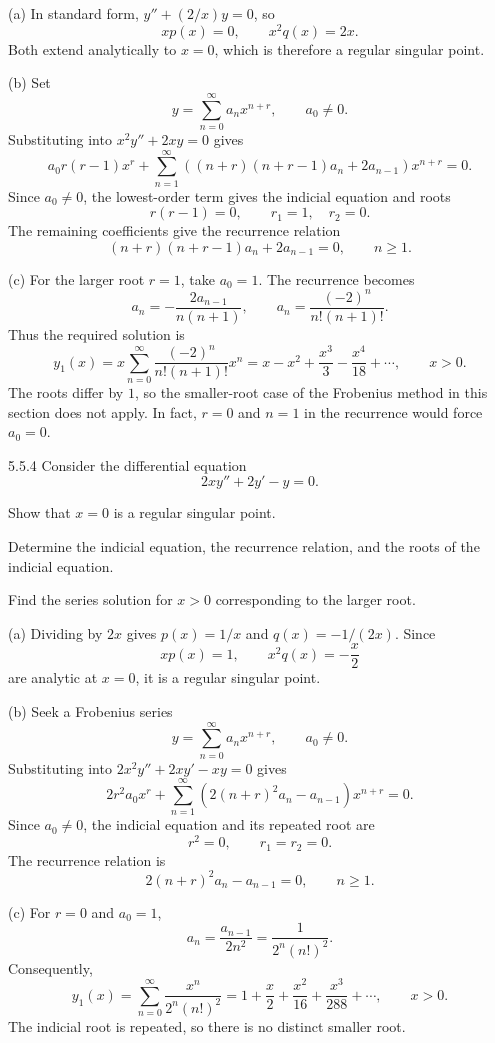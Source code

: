 \documentclass[11pt,oneside]{article}
\begin{document}
\begin{solution}
\noindent\textup{(a)} In standard form, $y''+(2/x)y=0$, so
\[
    xp(x)=0, \qquad x^2q(x)=2x.
\]
Both extend analytically to $x=0$, which is therefore a regular singular point.

\noindent\textup{(b)} Set
\[
    y=\sum_{n=0}^{\infty}a_nx^{n+r}, \qquad a_0\ne0.
\]
Substituting into $x^2y''+2xy=0$ gives
\[
    a_0r(r-1)x^r+\sum_{n=1}^{\infty}((n+r)(n+r-1)a_n+2a_{n-1})x^{n+r}=0.
\]
Since $a_0\ne0$, the lowest-order term gives the indicial equation and roots
\[
    \boxed{r(r-1)=0, \qquad r_1=1, \quad r_2=0}.
\]
The remaining coefficients give the recurrence relation
\[
    \boxed{(n+r)(n+r-1)a_n+2a_{n-1}=0}, \qquad n\geq1.
\]

\noindent\textup{(c)} For the larger root $r=1$, take $a_0=1$. The recurrence becomes
\[
    a_n=-\frac{2a_{n-1}}{n(n+1)}, \qquad
    a_n=\frac{(-2)^n}{n!(n+1)!}.
\]
Thus the required solution is
\[
    \boxed{y_1(x)=x\sum_{n=0}^{\infty}\frac{(-2)^n}{n!(n+1)!}x^n
    =x-x^2+\frac{x^3}{3}-\frac{x^4}{18}+\cdots}, \qquad x>0.
\]
The roots differ by $1$, so the smaller-root case of the Frobenius method in this section does not apply. In fact, $r=0$ and $n=1$ in the recurrence would force $a_0=0$.
\end{solution}

\begin{problem}{5.5.4}
Consider the differential equation
\[
    2xy''+2y'-y=0.
\]
\begin{problemsubparts}
    \item Show that $x=0$ is a regular singular point.
    \item Determine the indicial equation, the recurrence relation, and the roots of the indicial equation.
    \item Find the series solution for $x>0$ corresponding to the larger root.
\end{problemsubparts}
\end{problem}

\begin{solution}
\noindent\textup{(a)} Dividing by $2x$ gives $p(x)=1/x$ and $q(x)=-1/(2x)$. Since
\[
    xp(x)=1, \qquad x^2q(x)=-\frac{x}{2}
\]
are analytic at $x=0$, it is a regular singular point.

\noindent\textup{(b)} Seek a Frobenius series
\[
    y=\sum_{n=0}^{\infty}a_nx^{n+r}, \qquad a_0\ne0.
\]
Substituting into $2x^2y''+2xy'-xy=0$ gives
\[
    2r^2a_0x^r+\sum_{n=1}^{\infty}(2(n+r)^2a_n-a_{n-1})x^{n+r}=0.
\]
Since $a_0\ne0$, the indicial equation and its repeated root are
\[
    \boxed{r^2=0, \qquad r_1=r_2=0}.
\]
The recurrence relation is
\[
    \boxed{2(n+r)^2a_n-a_{n-1}=0}, \qquad n\geq1.
\]

\noindent\textup{(c)} For $r=0$ and $a_0=1$,
\[
    a_n=\frac{a_{n-1}}{2n^2}
    =\frac{1}{2^n(n!)^2}.
\]
Consequently,
\[
    \boxed{y_1(x)=\sum_{n=0}^{\infty}\frac{x^n}{2^n(n!)^2}
    =1+\frac{x}{2}+\frac{x^2}{16}+\frac{x^3}{288}+\cdots}, \qquad x>0.
\]
The indicial root is repeated, so there is no distinct smaller root.
\end{solution}
\end{document}
